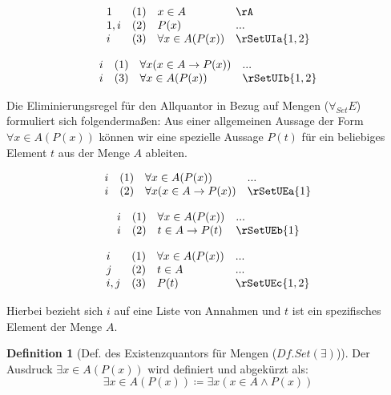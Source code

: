 \documentclass{book}
\theoremstyle{plain}
\theoremstyle{remark}
\theoremstyle{definition}
\newtheorem{definition}{Definition}[section]
\begin{document}
\[
\begin{array}{llll}
	1 & (1) & x\in A & \rA \\
	1,i & (2) & P(x) & ... \\
	i & (3) & \forall x \in A(P(x)) & \rSetUIa{1,2} \\
\end{array}
\]

\[
\begin{array}{llll}
	i & (1) & \forall x(x\in A\rightarrow P(x)) & ... \\
	i & (3) & \forall x \in A(P(x)) & \rSetUIb{1,2} \\
\end{array}
\]

Die Eliminierungsregel für den Allquantor in Bezug auf Mengen (\(\forall_{Set} E\)) formuliert sich folgendermaßen:
Aus einer allgemeinen Aussage der Form \(\forall x \in A(P(x))\) können wir eine spezielle Aussage \(P(t)\) für ein beliebiges Element \(t\) aus der Menge \(A\) ableiten.

\[
\begin{array}{llll}
	i & (1) & \forall x \in A(P(x)) & ... \\
	i & (2) & \forall x(x\in A\rightarrow P(x)) & \rSetUEa{1} \\
\end{array}
\]

\[
\begin{array}{llll}
	i & (1) & \forall x \in A(P(x)) & ... \\
	i & (2) & t\in A\rightarrow P(t) & \rSetUEb{1} \\
\end{array}
\]

\[
\begin{array}{llll}
	i & (1) & \forall x \in A(P(x)) & ... \\
        j & (2) & t \in A & ... \\
	i,j & (3) & P(t) & \rSetUEc{1,2} \\
\end{array}
\]

Hierbei bezieht sich \(i\) auf eine Liste von Annahmen und \(t\) ist ein spezifisches Element der Menge \(A\).

\begin{definition}[Def. des Existenzquantors für Mengen ($Df. Set(\exists)$)]
	Der Ausdruck \(\exists x \in A(P(x))\) wird definiert und abgekürzt als:
	\[
	\exists x \in A(P(x)) \coloneqq \exists x(x \in A \wedge P(x))
	\]
\end{definition}
\label{rule:rSetE} 
\end{document}
